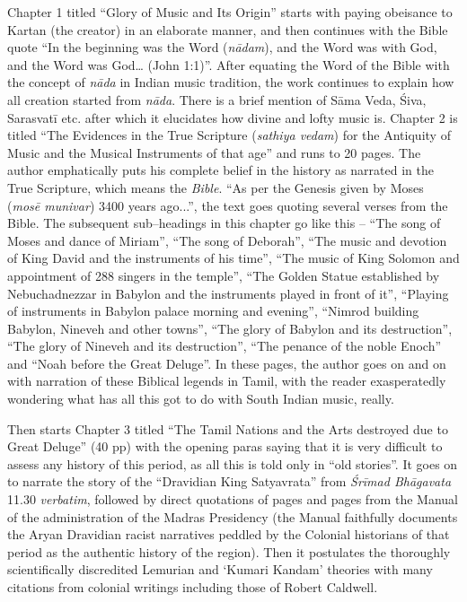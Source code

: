 Chapter 1 titled “Glory of Music and Its Origin” starts with paying obeisance to Kartan (the creator) in an elaborate manner, and then continues with the Bible quote “In the beginning was the Word (\textit{nādam}), and the Word was with God, and the Word was God… (John 1:1)”. After equating the Word of the Bible with the concept of \textit{nāda} in Indian music tradition, the work continues to explain how all creation started from \textit{nāda}. There is a brief mention of Sāma Veda, Śiva, Sarasvatī etc. after which it elucidates how divine and lofty music is. Chapter 2 is titled “The Evidences in the True Scripture (\textit{sathiya vedam}) for the Antiquity of Music and the Musical Instruments of that age” and runs to 20 pages. The author emphatically puts his complete belief in the history as narrated in the True Scripture, which means the \textit{Bible}. “As per the Genesis given by Moses (\textit{mosē munivar}) 3400 years ago...”, the text goes quoting several verses from the Bible. The subsequent sub–headings in this chapter go like this – “The song of Moses and dance of Miriam”, “The song of Deborah”, “The music and devotion of King David and the instruments of his time”, “The music of King Solomon and appointment of 288 singers in the temple”, “The Golden Statue established by Nebuchadnezzar in Babylon and the instruments played in front of it”, “Playing of instruments in Babylon palace morning and evening”, “Nimrod building Babylon, Nineveh and other towns”, “The glory of Babylon and its destruction”, “The glory of Nineveh and its destruction”, “The penance of the noble Enoch” and “Noah before the Great Deluge”. In these pages, the author goes on and on with narration of these Biblical legends in Tamil, with the reader exasperatedly wondering what has all this got to do with South Indian music, really.

Then starts Chapter 3 titled “The Tamil Nations and the Arts destroyed due to Great Deluge” (40 pp) with the opening paras saying that it is very difficult to assess any history of this period, as all this is told only in “old stories”. It goes on to narrate the story of the “Dravidian King Satyavrata” from \textit{Śrīmad Bhāgavata} 11.30 \textit{verbatim}, followed by direct quotations of pages and pages from the Manual of the administration of the Madras Presidency (the Manual faithfully documents the Aryan Dravidian racist narratives peddled by the Colonial historians of that period as the authentic history of the region). Then it postulates the thoroughly scientifically discredited Lemurian and ‘Kumari Kandam’ theories with many citations from colonial writings including those of Robert Caldwell.


